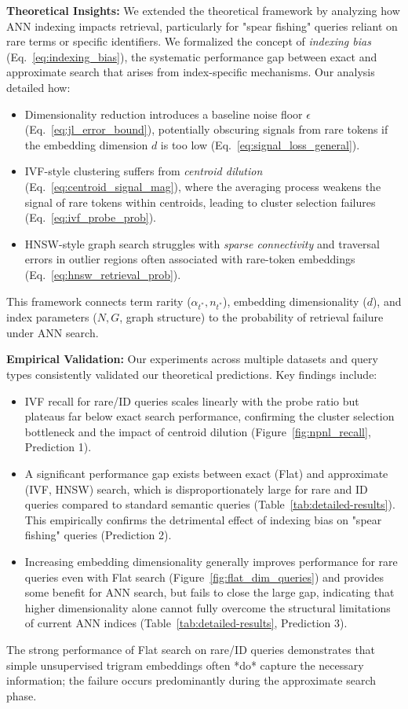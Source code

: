 \documentclass[manuscript]{acmart}
\begin{document}
\textbf{Theoretical Insights:} We extended the theoretical framework by analyzing how ANN indexing impacts retrieval, particularly for "spear fishing" queries reliant on rare terms or specific identifiers. We formalized the concept of \textit{indexing bias} (Eq.~\ref{eq:indexing_bias}), the systematic performance gap between exact and approximate search that arises from index-specific mechanisms. Our analysis detailed how:
\begin{itemize}
    \item Dimensionality reduction introduces a baseline noise floor $\epsilon$ (Eq.~\ref{eq:jl_error_bound}), potentially obscuring signals from rare tokens if the embedding dimension $d$ is too low (Eq.~\ref{eq:signal_loss_general}).
    \item IVF-style clustering suffers from \textit{centroid dilution} (Eq.~\ref{eq:centroid_signal_mag}), where the averaging process weakens the signal of rare tokens within centroids, leading to cluster selection failures (Eq.~\ref{eq:ivf_probe_prob}).
    \item HNSW-style graph search \cite{malkov2019efficient} struggles with \textit{sparse connectivity} and traversal errors in outlier regions often associated with rare-token embeddings (Eq.~\ref{eq:hnsw_retrieval_prob}).
\end{itemize}
This framework connects term rarity ($\alpha_{t^*}, n_{t^*}$), embedding dimensionality ($d$), and index parameters ($N, G$, graph structure) to the probability of retrieval failure under ANN search.

\textbf{Empirical Validation:} Our experiments across multiple datasets and query types consistently validated our theoretical predictions. Key findings include:
\begin{itemize}
    \item IVF recall for rare/ID queries scales linearly with the probe ratio but plateaus far below exact search performance, confirming the cluster selection bottleneck and the impact of centroid dilution (Figure~\ref{fig:npnl_recall}, Prediction 1).
    \item A significant performance gap exists between exact (Flat) and approximate (IVF, HNSW) search, which is disproportionately large for rare and ID queries compared to standard semantic queries (Table~\ref{tab:detailed-results}). This empirically confirms the detrimental effect of indexing bias on "spear fishing" queries (Prediction 2).
    \item Increasing embedding dimensionality generally improves performance for rare queries even with Flat search (Figure~\ref{fig:flat_dim_queries}) and provides some benefit for ANN search, but fails to close the large gap, indicating that higher dimensionality alone cannot fully overcome the structural limitations of current ANN indices (Table~\ref{tab:detailed-results}, Prediction 3).
\end{itemize}
The strong performance of Flat search on rare/ID queries demonstrates that simple unsupervised trigram embeddings often *do* capture the necessary information; the failure occurs predominantly during the approximate search phase.
\end{document}
